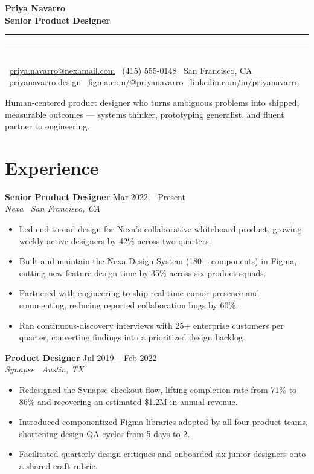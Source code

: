 \documentclass[10pt]{article}
\newcommand{\cvrole}[3]{%
  \vspace{4pt}\noindent\textbf{\large #1} \hfill {\small\color{slate}#3}\\
  {\color{accent}\itshape #2}\\[1pt]
}
\newcommand{\tagline}[1]{{\color{slate}\small #1}}
\begin{document}
\begin{center}
  {\fontsize{25}{28}\selectfont\bfseries Priya Navarro}\\[2pt]
  {\large\color{accent}\bfseries Senior Product Designer}\\[4pt]
  {\color{accent}\rule{0.62\linewidth}{1.4pt}}{\color{slate}\rule{0.20\linewidth}{1.4pt}}\\[5pt]
  \small
  \faEnvelope\ \href{mailto:priya.navarro@nexamail.com}{priya.navarro@nexamail.com} \quad
  \faPhone\ (415) 555-0148 \quad
  \faMapMarker\ San Francisco, CA \quad
  \faGlobe\ \href{https://priyanavarro.design}{priyanavarro.design} \quad
  \faLink\ \href{https://figma.com/@priyanavarro}{figma.com/@priyanavarro} \quad
  \faLinkedin\ \href{https://linkedin.com/in/priyanavarro}{linkedin.com/in/priyanavarro}
\end{center}

\vspace{2pt}
\tagline{Human-centered product designer who turns ambiguous problems into shipped, measurable outcomes --- systems thinker, prototyping generalist, and fluent partner to engineering.}

\section{Experience}

\cvrole{Senior Product Designer}{Nexa \textbar\ San Francisco, CA}{Mar 2022 -- Present}
\begin{itemize}
  \item Led end-to-end design for Nexa's collaborative whiteboard product, growing weekly active designers by 42\% across two quarters.
  \item Built and maintain the Nexa Design System (180+ components) in Figma, cutting new-feature design time by 35\% across six product squads.
  \item Partnered with engineering to ship real-time cursor-presence and commenting, reducing reported collaboration bugs by 60\%.
  \item Ran continuous-discovery interviews with 25+ enterprise customers per quarter, converting findings into a prioritized design backlog.
\end{itemize}

\cvrole{Product Designer}{Synapse \textbar\ Austin, TX}{Jul 2019 -- Feb 2022}
\begin{itemize}
  \item Redesigned the Synapse checkout flow, lifting completion rate from 71\% to 86\% and recovering an estimated \$1.2M in annual revenue.
  \item Introduced componentized Figma libraries adopted by all four product teams, shortening design-QA cycles from 5 days to 2.
  \item Facilitated quarterly design critiques and onboarded six junior designers onto a shared craft rubric.
\end{itemize}
\end{document}
